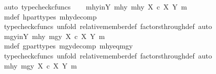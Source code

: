 \begin{isabellebody}
\ {\isacharparenleft}{\kern0pt}auto{\isacharcomma}{\kern0pt}\ typecheck{\isacharunderscore}{\kern0pt}cfuncs{\isacharparenright}{\kern0pt}\isanewline
\ \ \isamarkupfalse%
\ mhy{\isacharunderscore}{\kern0pt}in{\isacharunderscore}{\kern0pt}Y{\isacharcolon}{\kern0pt}\ {\isachardoublequoteopen}{\isasymlangle}mhy{}{\isacharcomma}{\kern0pt}\ mhy{}{\isasymrangle}\ {\isasymin}\isactrlbsub X\ {\isasymtimes}\isactrlsub c\ X\isactrlesub \ {\isacharparenleft}{\kern0pt}Y{\isacharcomma}{\kern0pt}\ m{\isacharparenright}{\kern0pt}{\isachardoublequoteclose}\isanewline
\ \ \ \ \isamarkupfalse%
\ m{\isacharunderscore}{\kern0pt}def\ h{\isacharunderscore}{\kern0pt}part{\isacharunderscore}{\kern0pt}types\ mhy{\isacharunderscore}{\kern0pt}decomp\isanewline
\ \ \ \ \isamarkupfalse%
\ {\isacharparenleft}{\kern0pt}typecheck{\isacharunderscore}{\kern0pt}cfuncs{\isacharcomma}{\kern0pt}\ unfold\ relative{\isacharunderscore}{\kern0pt}member{\isacharunderscore}{\kern0pt}def{}\ factors{\isacharunderscore}{\kern0pt}through{\isacharunderscore}{\kern0pt}def{}{\isacharcomma}{\kern0pt}\ auto{\isacharparenright}{\kern0pt}\isanewline
\ \ \isamarkupfalse%
\ mgy{\isacharunderscore}{\kern0pt}in{\isacharunderscore}{\kern0pt}Y{\isacharcolon}{\kern0pt}\ {\isachardoublequoteopen}{\isasymlangle}mhy{}{\isacharcomma}{\kern0pt}\ mgy{}{\isasymrangle}\ {\isasymin}\isactrlbsub X\ {\isasymtimes}\isactrlsub c\ X\isactrlesub \ {\isacharparenleft}{\kern0pt}Y{\isacharcomma}{\kern0pt}\ m{\isacharparenright}{\kern0pt}{\isachardoublequoteclose}\isanewline
\ \ \ \ \isamarkupfalse%
\ m{\isacharunderscore}{\kern0pt}def\ g{\isacharunderscore}{\kern0pt}part{\isacharunderscore}{\kern0pt}types\ mgy{\isacharunderscore}{\kern0pt}decomp\ mhy{}{\isacharunderscore}{\kern0pt}eq{\isacharunderscore}{\kern0pt}mgy{}\isanewline
\ \ \ \ \isamarkupfalse%
\ {\isacharparenleft}{\kern0pt}typecheck{\isacharunderscore}{\kern0pt}cfuncs{\isacharcomma}{\kern0pt}\ unfold\ relative{\isacharunderscore}{\kern0pt}member{\isacharunderscore}{\kern0pt}def{}\ factors{\isacharunderscore}{\kern0pt}through{\isacharunderscore}{\kern0pt}def{}{\isacharcomma}{\kern0pt}\ auto{\isacharparenright}{\kern0pt}\isanewline
\ \ \isamarkupfalse%
\ {\isachardoublequoteopen}{\isasymlangle}mhy{}{\isacharcomma}{\kern0pt}\ mgy{}{\isasymrangle}\ {\isasymin}\isactrlbsub X\ {\isasymtimes}\isactrlsub c\ X\isactrlesub \ {\isacharparenleft}{\kern0pt}Y{\isacharcomma}{\kern0pt}\ m{\isacharparenright}{\kern0pt}{\isachardoublequoteclose}\isanewline

\end{isabellebody}
